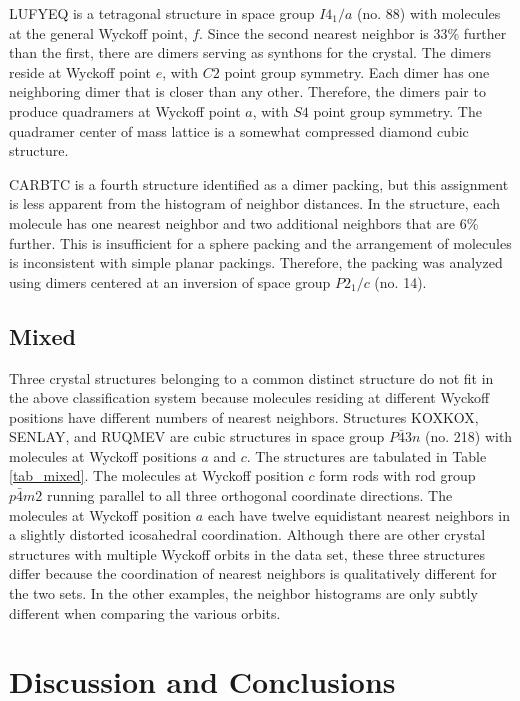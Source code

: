 \documentclass[preprint]{iucr}              %
\begin{document}
LUFYEQ is a tetragonal structure in space group $I4_1/a$ (no. 88) with molecules at the general Wyckoff point, $f$.  Since the second nearest neighbor is 33\% further than the first, there are dimers serving as synthons for the crystal.  The dimers reside at Wyckoff point $e$, with $C2$ point group symmetry.  Each dimer has one neighboring dimer that is closer than any other.  Therefore, the dimers pair to produce quadramers at Wyckoff point $a$, with $S4$ point group symmetry.  The quadramer center of mass lattice is a somewhat compressed diamond cubic structure.

CARBTC is a fourth structure identified as a dimer packing, but this assignment is less apparent from the histogram of neighbor distances.  In the structure, each molecule has one nearest neighbor and two additional neighbors that are 6\% further.  This is insufficient for a sphere packing and the arrangement of molecules is inconsistent with simple planar packings.  Therefore, the packing was analyzed using dimers centered at an inversion of space group $P2_1/c$ (no. 14).

\subsection{Mixed}

Three crystal structures belonging to a common distinct structure do not fit in the above classification system because molecules residing at different Wyckoff positions have different numbers of nearest neighbors.  Structures KOXKOX, SENLAY, and RUQMEV are cubic structures in space group $P\bar{4}3n$ (no. 218) with molecules at Wyckoff positions $a$ and $c$.  The structures are tabulated in Table \ref{tab_mixed}.  The molecules at Wyckoff position $c$ form rods with rod group $p\bar{4}m2$ running parallel to all three orthogonal coordinate directions.  The molecules at Wyckoff position $a$ each have twelve equidistant nearest neighbors in a slightly distorted icosahedral coordination.  Although there are other crystal structures with multiple Wyckoff orbits in the data set, these three structures differ because the coordination of nearest neighbors is qualitatively different for the two sets.  In the other examples, the neighbor histograms are only subtly different when comparing the various orbits.  



\section{Discussion and Conclusions}
\label{sec:Discussion}
\end{document}
